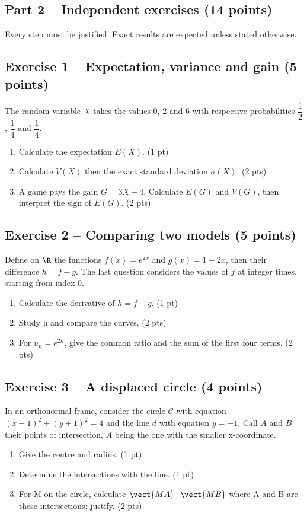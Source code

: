 \mxnewpage\subsection*{Part 2 -- Independent exercises (14 points)}
Every step must be justified. Exact results are expected unless stated otherwise.
\subsection*{Exercise 1 -- Expectation, variance and gain (5 points)}
The random variable $X$ takes the values 0, 2 and 6 with respective probabilities $\dfrac12$, $\dfrac14$ and $\dfrac14$.
\begin{enumerate}
\item Calculate the expectation $E(X)$. \hfill(1 pt)
\item Calculate $V(X)$ then the exact standard deviation $\sigma(X)$. \hfill(2 pts)
\item A game pays the gain $G=3X-4$. Calculate $E(G)$ and $V(G)$, then interpret the sign of $E(G)$. \hfill(2 pts)
\end{enumerate}
\subsection*{Exercise 2 -- Comparing two models (5 points)}
Define on $\R$ the functions $f(x)=e^{2x}$ and $g(x)=1+2x$, then their difference $h=f-g$. The last question considers the values of $f$ at integer times, starting from index 0.
\begin{enumerate}
\item Calculate the derivative of $h=f-g$. \hfill(1 pt)
\item Study h and compare the curves. \hfill(2 pts)
\item For $u_n=e^{2n}$, give the common ratio and the sum of the first four terms. \hfill(2 pts)
\end{enumerate}
\subsection*{Exercise 3 -- A displaced circle (4 points)}
In an orthonormal frame, consider the circle $\mathcal C$ with equation $(x-1)^2+(y+1)^2=4$ and the line $d$ with equation $y=-1$. Call $A$ and $B$ their points of intersection, $A$ being the one with the smaller x-coordinate.
\begin{enumerate}
\item Give the centre and radius. \hfill(1 pt)
\item Determine the intersections with the line. \hfill(1 pt)
\item For M on the circle, calculate $\vect{MA}\cdot\vect{MB}$ where A and B are these intersections; justify. \hfill(2 pts)
\end{enumerate}

